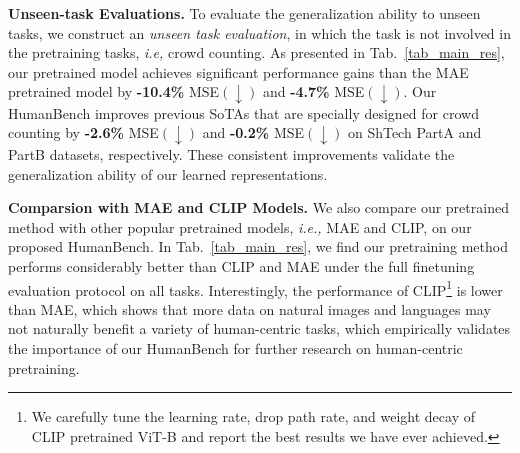 \documentclass[10pt,twocolumn,letterpaper]{article}
\begin{document}
\noindent \textbf{Unseen-task Evaluations.} \label{sec:unseen}
To evaluate the generalization ability to unseen tasks, we construct an \emph{unseen task evaluation}, in which the task is not involved in the pretraining tasks, \emph{i.e,} crowd counting. As presented in Tab.~\ref{tab_main_res}, our pretrained model achieves significant performance gains than the MAE pretrained model by \textbf{-10.4\%} MSE$(\downarrow)$ and \textbf{-4.7\%} MSE$(\downarrow)$. Our HumanBench improves previous SoTAs that are specially designed for crowd counting by \textbf{-2.6\%} MSE$(\downarrow)$ and \textbf{-0.2\%} MSE$(\downarrow)$ on ShTech PartA and PartB datasets, respectively. These consistent improvements validate the generalization ability of our learned representations.


\noindent \textbf{Comparsion with MAE and CLIP Models.} We also compare our pretrained method with other popular pretrained models, \emph{i.e.,} MAE and CLIP, on our proposed HumanBench. In Tab.~\ref{tab_main_res}, we find our pretraining method performs considerably better than CLIP and MAE under the full finetuning evaluation protocol on all tasks. Interestingly, the performance of CLIP\footnote{We carefully tune the learning rate, drop path rate, and weight decay of CLIP pretrained ViT-B and report the best results we have ever achieved.} is lower than MAE, which shows that more data on natural images and languages may not naturally benefit a variety of human-centric tasks, which empirically validates the importance of our HumanBench for further research on human-centric pretraining. 
\end{document}

